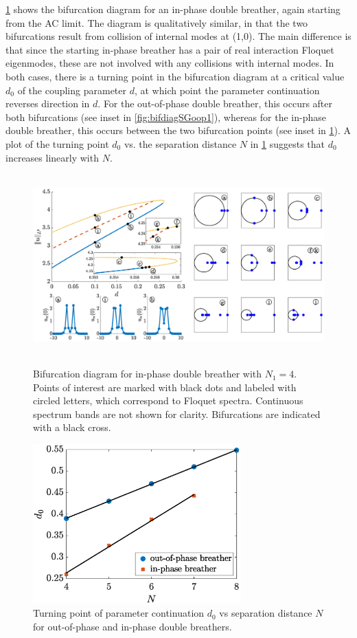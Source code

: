 \documentclass[12pt,reqno]{amsart}
\theoremstyle{definition}
\begin{document}
\cref{fig:bifdiagSGip1} shows the bifurcation diagram for an in-phase double breather, again starting from the AC limit. The diagram is qualitatively similar, in that the two bifurcations result from collision of internal modes at (1,0). The main difference is that since the starting in-phase breather has a pair of real interaction Floquet eigenmodes, these are not involved with any collisions with internal modes. In both cases, there is a turning point in the bifurcation diagram at a critical value $d_0$ of the coupling parameter $d$, at which point the parameter continuation reverses direction in $d$. For the out-of-phase double breather, this occurs after both bifurcations (see inset in \cref{fig:bifdiagSGoop1}), whereas for the in-phase double breather, this occurs between the two bifurcation points (see inset in \cref{fig:bifdiagSGip1}). A plot of the turning point $d_0$ vs. the separation distance $N$ in \cref{fig:bifdiagSGip1} suggests that $d_0$ increases linearly with $N$.

\begin{figure}
	\hbox{
	\hspace{-2cm}
	\includegraphics[width=20cm]{bifdiagSGinphaseN4.eps} 
	}
	\caption{Bifurcation diagram for in-phase double breather with $N_1 = 4$. Points of interest are marked with black dots and labeled with circled letters, which correspond to Floquet spectra. Continuous spectrum bands are not shown for clarity. Bifurcations are indicated with a black cross. }
	\label{fig:bifdiagSGip1}
\end{figure}

\begin{figure}
	\begin{center}
	\includegraphics[width=8cm]{doubled0vsN.eps} 
	\end{center}
	\caption{Turning point of parameter continuation $d_0$ vs separation distance $N$ for out-of-phase and in-phase double breathers.}
	\label{fig:SGd0}
\end{figure}
\end{document}
